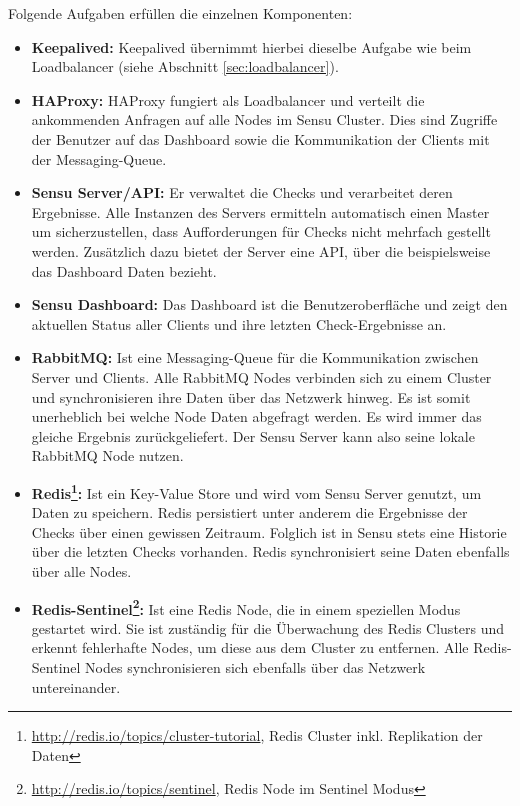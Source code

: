 Folgende Aufgaben erfüllen die einzelnen Komponenten:
\begin{itemize}
 \item \textbf{Keepalived:} Keepalived übernimmt hierbei dieselbe Aufgabe wie beim Loadbalancer (siehe Abschnitt \ref{sec:loadbalancer}).
 \item \textbf{HAProxy:} HAProxy fungiert als Loadbalancer und verteilt die ankommenden Anfragen auf alle Nodes im Sensu Cluster. Dies sind Zugriffe der Benutzer auf das Dashboard sowie die Kommunikation der Clients mit der Messaging-Queue.
 \item \textbf{Sensu Server/API:} Er verwaltet die Checks und verarbeitet deren Ergebnisse. Alle Instanzen des Servers ermitteln automatisch einen Master um sicherzustellen, dass Aufforderungen für Checks nicht mehrfach gestellt werden. Zusätzlich dazu bietet der Server eine API, über die beispielsweise das Dashboard Daten bezieht.
 \item \textbf{Sensu Dashboard:} Das Dashboard ist die Benutzeroberfläche und zeigt den aktuellen Status aller Clients und ihre letzten Check-Ergebnisse an.
 \item \textbf{RabbitMQ:} Ist eine Messaging-Queue für die Kommunikation zwischen Server und Clients. Alle RabbitMQ Nodes verbinden sich zu einem Cluster und synchronisieren ihre Daten über das Netzwerk hinweg. Es ist somit unerheblich bei welche Node Daten abgefragt werden. Es wird immer das gleiche Ergebnis zurückgeliefert. Der Sensu Server kann also seine lokale RabbitMQ Node nutzen.
 \item \textbf{Redis\footnote{\url{http://redis.io/topics/cluster-tutorial}, Redis Cluster inkl. Replikation der Daten}:} Ist ein Key-Value Store und wird vom Sensu Server genutzt, um Daten zu speichern. Redis persistiert unter anderem die Ergebnisse der Checks über einen gewissen Zeitraum. Folglich ist in Sensu stets eine Historie über die letzten Checks vorhanden. Redis synchronisiert seine Daten ebenfalls über alle Nodes.
 \item \textbf{Redis-Sentinel\footnote{\url{http://redis.io/topics/sentinel}, Redis Node im Sentinel Modus}:} Ist eine Redis Node, die in einem speziellen Modus gestartet wird. Sie ist zuständig für die Überwachung des Redis Clusters und erkennt fehlerhafte Nodes, um diese aus dem Cluster zu entfernen. Alle Redis-Sentinel Nodes synchronisieren sich ebenfalls über das Netzwerk untereinander.
\end{itemize}

